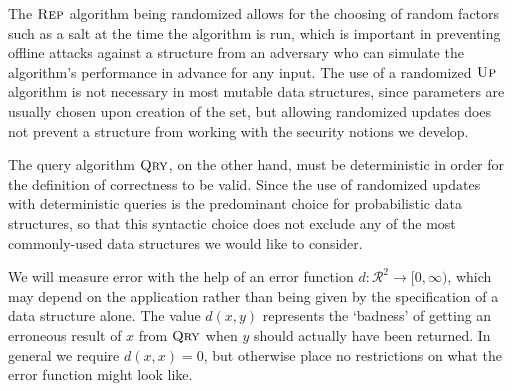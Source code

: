 
 

The $\textsc{Rep}$ algorithm being randomized allows for the choosing of random factors such as a salt at the time the algorithm is run, which is important in preventing offline attacks against a structure from an adversary who can simulate the algorithm's performance in advance for any input. The use of a randomized $\textsc{Up}$ algorithm is not necessary in most mutable data structures, since parameters are usually chosen upon creation of the set, but allowing randomized updates does not prevent a structure from working with the security notions we develop.

The query algorithm $\textsc{Qry}$, on the other hand, must be deterministic in order for the definition of correctness to be valid. Since the use of randomized updates with deterministic queries is the predominant choice for probabilistic data structures, so that this syntactic choice does not exclude any of the most commonly-used data structures we would like to consider.

We will measure error with the help of an error function $d: \mathcal{R}^2 \to [0,\infty)$, which may depend on the application rather than being given by the specification of a data structure alone. The value $d(x,y)$ represents the `badness' of getting an erroneous result of $x$ from $\textsc{Qry}$ when $y$ should actually have been returned. In general we require $d(x,x) = 0$, but otherwise place no restrictions on what the error function might look like.